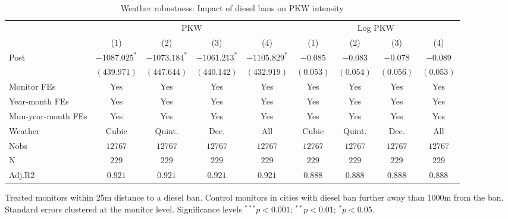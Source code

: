 
\begin{table}[h]
\caption{Weather robustness: Impact of diesel bans on PKW intensity}
\begin{center}
\begin{footnotesize}
\begin{threeparttable}
\begin{tabular}{l c c c c c c c c}
\toprule
& \multicolumn{4}{c}{PKW} & \multicolumn{4}{c}{Log PKW}  \\ \cmidrule(r){2-5} \cmidrule(r){6-9}
 & (1) & (2) & (3) & (4) & (1) & (2) & (3) & (4) \\
\midrule
Post   & $-1087.025^{*}$ & $-1073.184^{*}$ & $-1061.213^{*}$ & $-1105.829^{*}$ & $-0.085$  & $-0.083$  & $-0.078$  & $-0.089$  \\
       & $(439.971)$     & $(447.644)$     & $(440.142)$     & $(432.919)$     & $(0.053)$ & $(0.054)$ & $(0.056)$ & $(0.053)$ \\
\midrule
Monitor FEs   & Yes & Yes & Yes  & Yes & Yes & Yes & Yes & Yes     \\
Year-month FEs     & Yes & Yes & Yes  & Yes & Yes & Yes & Yes & Yes   \\
Mun-year-month FEs     & Yes & Yes & Yes  & Yes & Yes & Yes & Yes & Yes   \\
Weather     & Cubic & Quint. & Dec.  & All & Cubic & Quint. & Dec.  & All    \\ \midrule
Nobs   & $12767$         & $12767$         & $12767$         & $12767$         & $12767$   & $12767$   & $12767$   & $12767$   \\
N      & $229$           & $229$           & $229$           & $229$           & $229$     & $229$     & $229$     & $229$     \\
Adj.R2 & $0.921$         & $0.921$         & $0.921$         & $0.921$         & $0.888$   & $0.888$   & $0.888$   & $0.888$   \\
\bottomrule
\end{tabular}
\begin{tablenotes}[flushleft]
\tiny{\item Treated monitors within 25m distance to a diesel ban.
       Control monitors in cities with diesel ban further away than 1000m from the ban.
       Standard errors clustered at the monitor level.
       Significance levels $^{***}p<0.001$; $^{**}p<0.01$; $^{*}p<0.05$.}
\end{tablenotes}
\end{threeparttable}
\end{footnotesize}
\label{table:coefficients}
\end{center}
\end{table}
